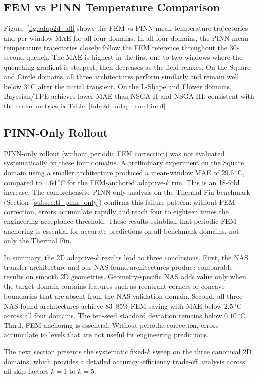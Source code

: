 \subsection{FEM vs PINN Temperature Comparison}
\label{subsec:2d_adap_fem_pinn}

Figure~\ref{fig:adap2d_all} shows the FEM vs PINN mean temperature trajectories
and per-window MAE for all four domains.
In all four domains, the PINN mean temperature trajectories closely follow
the FEM reference throughout the 30-second quench.
The MAE is highest in the first one to two windows where the quenching
gradient is steepest, then decreases as the field relaxes.
On the Square and Circle domains, all three architectures perform similarly
and remain well below $3\,^\circ\mathrm{C}$ after the initial transient.
On the L-Shape and Flower domains, Bayesian/TPE achieves lower MAE than
NSGA-II and NSGA-III, consistent with the scalar metrics in
Table~\ref{tab:2d_adap_combined}.

\subsection{PINN-Only Rollout}
\label{subsec:2d_adap_pinn_only}

PINN-only rollout (without periodic FEM correction) was not evaluated
systematically on these four domains.
A preliminary experiment on the Square domain using a smaller architecture
produced a mean-window MAE of $29.6\,^\circ\mathrm{C}$, compared to
$1.64\,^\circ\mathrm{C}$ for the FEM-anchored adaptive-$k$ run.
This is an 18-fold increase.
The comprehensive PINN-only analysis on the Thermal Fin benchmark
(Section~\ref{subsec:tf_pinn_only}) confirms this failure pattern: without
FEM correction, errors accumulate rapidly and reach four to eighteen times
the engineering acceptance threshold.
These results establish that periodic FEM anchoring is essential for accurate
predictions on all benchmark domains, not only the Thermal Fin.

In summary, the 2D adaptive-$k$ results lead to three conclusions.
First, the NAS transfer architecture and our NAS-found architectures produce
comparable results on smooth 2D geometries.
Geometry-specific NAS adds value only when the target domain contains
features such as reentrant corners or concave boundaries that are absent
from the NAS validation domain.
Second, all three NAS-found architectures achieve 83--85\% FEM saving with
MAE below $2.5\,^\circ\mathrm{C}$ across all four domains.
The ten-seed standard deviation remains below $0.10\,^\circ\mathrm{C}$.
Third, FEM anchoring is essential.
Without periodic correction, errors accumulate to levels that are not
useful for engineering predictions.

The next section presents the systematic fixed-$k$ sweep on the three
canonical 2D domains, which provides a detailed accuracy--efficiency
trade-off analysis across all skip factors $k=1$ to $k=5$.
